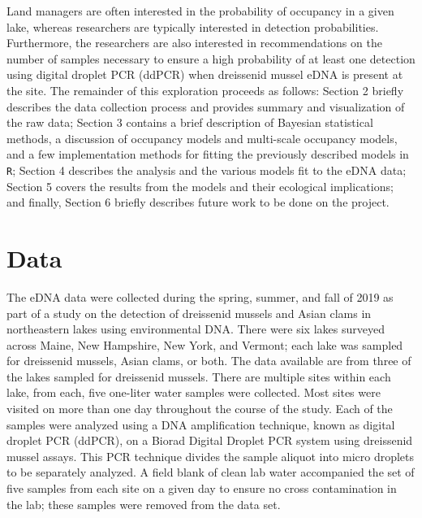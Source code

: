 \documentclass[12pt]{article}\usepackage[]{graphicx}\usepackage[]{color}
\begin{document}
Land managers are often interested in the probability of occupancy in a given lake, whereas researchers are typically interested in detection probabilities. Furthermore, the researchers are also interested in recommendations on the number of samples necessary to ensure a high probability of at least one detection using digital droplet PCR (ddPCR) when dreissenid mussel eDNA is present at the site. The remainder of this exploration proceeds as follows: Section 2 briefly describes the data collection process and provides summary and visualization of the raw data; Section 3 contains a brief description of Bayesian statistical methods, a discussion of occupancy models and multi-scale occupancy models, and a few implementation methods for fitting the previously described models in \texttt{R}; Section 4 describes the analysis and the various models fit to the eDNA data; Section 5 covers the results from the models and their ecological implications; and finally, Section 6 briefly describes future work to be done on the project.

\section{Data}



The eDNA data were collected during the spring, summer, and fall of 2019 as part of a study on the detection of dreissenid mussels and Asian clams in northeastern lakes using environmental DNA. There were six lakes surveyed across Maine, New Hampshire, New York, and Vermont; each lake was sampled for dreissenid mussels, Asian clams, or both. The data available are from three of the lakes sampled for dreissenid mussels. There are multiple sites within each lake, from each, five one-liter water samples were collected. Most sites were visited on more than one day throughout the course of the study. Each of the samples were analyzed using a DNA amplification technique, known as digital droplet PCR (ddPCR), on a Biorad Digital Droplet PCR system using dreissenid mussel assays. This PCR technique divides the sample aliquot into micro droplets to be separately analyzed. A field blank of clean lab water accompanied the set of five samples from each site on a given day to ensure no cross contamination in the lab; these samples were removed from the data set. 
\end{document}
